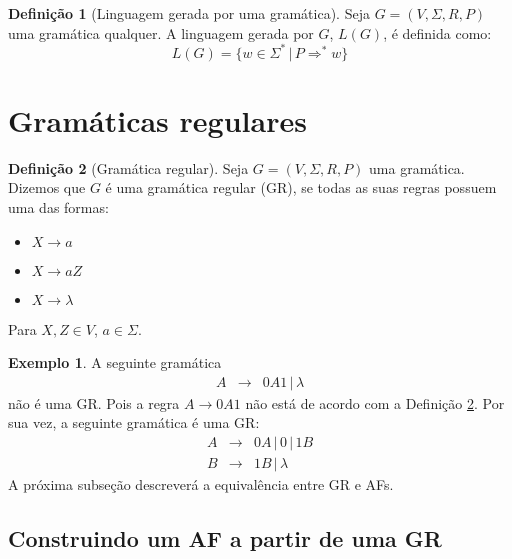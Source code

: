 \documentclass[a4paper]{article}
\theoremstyle{definition}
\newtheorem{Example}{Exemplo}
\newtheorem{Definition}{Definição}
\begin{document}
  \begin{Definition}[Linguagem gerada por uma gramática]
    Seja $G = (V,\Sigma,R,P)$ uma gramática qualquer. A linguagem gerada por
    $G$, $L(G)$, é definida como:
    \[
      L(G) = \{w \in \Sigma^* \,|\, P \Rightarrow^* w\}
    \]
  \end{Definition}

  \section{Gramáticas regulares}

  \begin{Definition}[Gramática regular]\label{gramreg}
    Seja $G = (V,\Sigma,R,P)$ uma gramática. Dizemos que $G$ é uma gramática
    regular (GR), se todas as suas regras possuem uma das formas:
    \begin{itemize}
      \item $X \to a$
      \item $X \to aZ$
      \item $X \to \lambda$
    \end{itemize}
    Para $X,Z \in V$, $a \in \Sigma$.  
  \end{Definition}

  \begin{Example}
    A seguinte gramática
    \[
      \begin{array}{lcl}
        A & \to & 0A1 \,|\, \lambda
      \end{array}
    \]
    não é uma GR. Pois a regra $A \to 0A1$ não está de acordo com a Definição
    \ref{gramreg}. Por sua vez, a seguinte gramática é uma GR:
    \[
      \begin{array}{lcl}
        A & \to & 0A \,|\,0\,|\,1B \\
        B & \to & 1B \,|\,\lambda
      \end{array}
    \]
    A próxima subseção descreverá a equivalência entre GR e AFs.
  \end{Example}

  \subsection{Construindo um AF a partir de uma GR}
\end{document}
